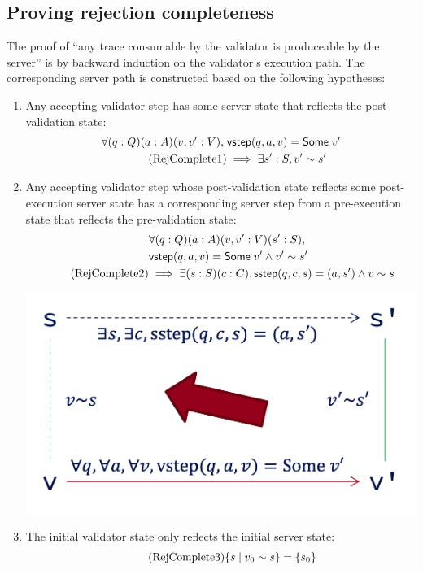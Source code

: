 \subsection{Proving rejection completeness}
The proof of ``any trace consumable by the validator is produceable by the
server'' is by backward induction on the validator's execution path.  The
corresponding server path is constructed based on the following hypotheses:

\begin{enumerate}
\item Any accepting validator step has some server state that reflects the
  post-validation state:
  \begin{align*}
    \forall(q:Q)(a:A)(v, v':V),\;&\mathsf{vstep}(q,a,v)=\mathsf{Some}\;v'\\
    \tag{RejComplete1}
    \label{eq:rc1}
    &\implies\exists s':S,v'\sim s' 
  \end{align*}
\item Any accepting validator step whose post-validation state reflects some
  post-execution server state has a corresponding server step from a
  pre-execution state that reflects the pre-validation state:
  \begin{align*}
    &\forall(q:Q)(a:A)(v,v':V)(s':S),\\
    &\mathsf{vstep}(q,a,v)=\mathsf{Some}\;v'\wedge v'\sim s'\\
    \tag{RejComplete2}
    \label{eq:rc2}
    &\implies\exists(s:S)(c:C),\mathsf{sstep}(q,c,s)=(a,s')\wedge v\sim s
  \end{align*}
  \begin{center}
    \includegraphics[width=.5\textwidth]{figures/complete}
  \end{center}

\item The initial validator state only reflects the initial server state:
  \begin{equation}
    \tag{RejComplete3}
    \label{eq:rc3}
    \{s\mid v_0\sim s\}=\{s_0\}
  \end{equation}
\end{enumerate}

